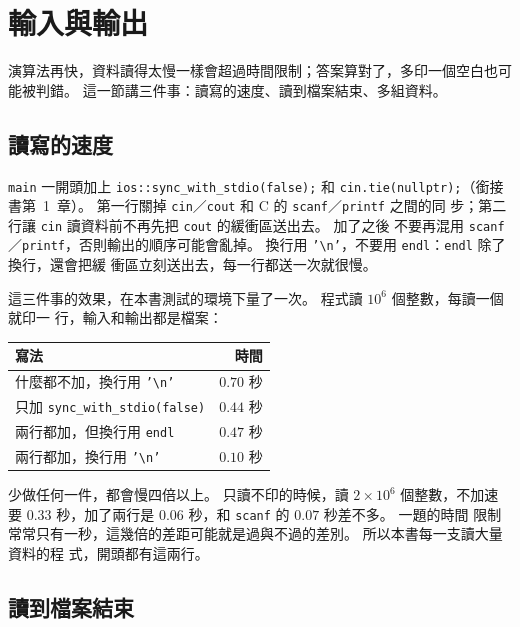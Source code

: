 \section{輸入與輸出}
\label{sec:io}

演算法再快，資料讀得太慢一樣會超過時間限制；答案算對了，多印一個空白也可能被判錯。
這一節講三件事：讀寫的速度、讀到檔案結束、多組資料。

\subsection{讀寫的速度}

\begin{bridgerecap}[輸入加速的兩行]
\texttt{main} 一開頭加上
\texttt{ios::sync\_with\_stdio(false);} 和 \texttt{cin.tie(nullptr);}（銜接書第~1~章）。
第一行關掉 \texttt{cin}／\texttt{cout} 和 C 的 \texttt{scanf}／\texttt{printf} 之間的同
步；第二行讓 \texttt{cin} 讀資料前不再先把 \texttt{cout} 的緩衝區送出去。 加了之後
不要再混用 \texttt{scanf}／\texttt{printf}，否則輸出的順序可能會亂掉。 換行用
\texttt{'\textbackslash n'}，不要用 \texttt{endl}：\texttt{endl} 除了換行，還會把緩
衝區立刻送出去，每一行都送一次就很慢。
\end{bridgerecap}

這三件事的效果，在本書測試的環境下量了一次。 程式讀 $10^6$ 個整數，每讀一個就印一
行，輸入和輸出都是檔案：

\begin{center}
\begin{tabular}{lr}
\toprule
寫法 & 時間 \\
\midrule
什麼都不加，換行用 \texttt{'\textbackslash n'} & $0.70$ 秒 \\
只加 \texttt{sync\_with\_stdio(false)} & $0.44$ 秒 \\
兩行都加，但換行用 \texttt{endl} & $0.47$ 秒 \\
兩行都加，換行用 \texttt{'\textbackslash n'} & $0.10$ 秒 \\
\bottomrule
\end{tabular}
\end{center}

少做任何一件，都會慢四倍以上。 只讀不印的時候，讀 $2 \times 10^6$ 個整數，不加速要
$0.33$ 秒，加了兩行是 $0.06$ 秒，和 \texttt{scanf} 的 $0.07$ 秒差不多。 一題的時間
限制常常只有一秒，這幾倍的差距可能就是過與不過的差別。 所以本書每一支讀大量資料的程
式，開頭都有這兩行。

\subsection{讀到檔案結束}

